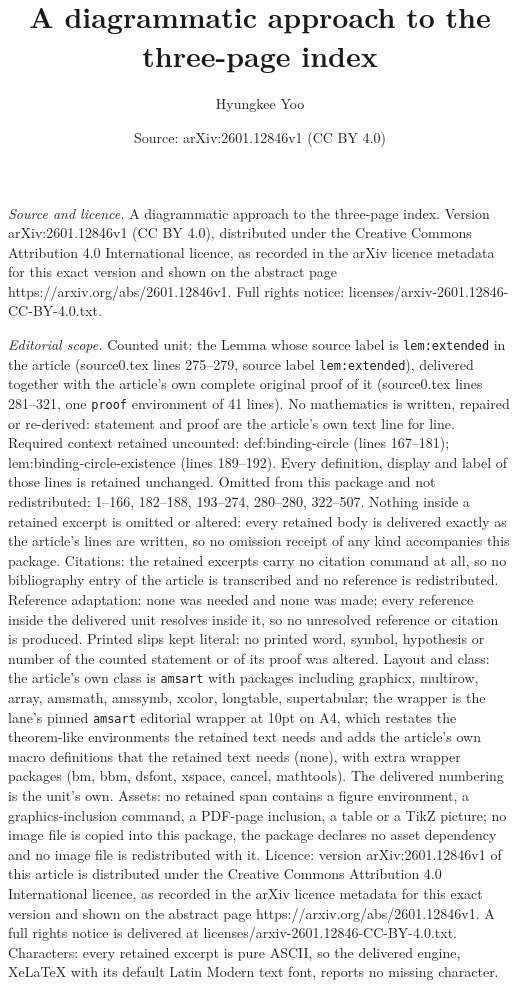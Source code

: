 \documentclass[10pt,a4paper]{amsart}
\title[A diagrammatic approach to the three-page index]{A diagrammatic approach to the three-page index}
\author{Hyungkee Yoo}
\date{Source: arXiv:2601.12846v1 (CC BY 4.0)}
\begin{document}
\maketitle

\noindent\emph{Source and licence.} A diagrammatic approach to the three-page index. Version arXiv:2601.12846v1 (CC BY 4.0), distributed under the Creative Commons Attribution 4.0 International licence, as recorded in the arXiv licence metadata for this exact version and shown on the abstract page https://arxiv.org/abs/2601.12846v1. Full rights notice: licenses/arxiv-2601.12846-CC-BY-4.0.txt.\par\smallskip

\noindent\textit{Editorial scope.} Counted unit: the Lemma whose source label is \texttt{lem:extended} in the article (source0.tex lines 275--279, source label \texttt{lem:extended}), delivered together with the article's own complete original proof of it (source0.tex lines 281--321, one \texttt{proof} environment of 41 lines). No mathematics is written, repaired or re-derived: statement and proof are the article's own text line for line. Required context retained uncounted: def:binding-circle (lines 167--181); lem:binding-circle-existence (lines 189--192). Every definition, display and label of those lines is retained unchanged. Omitted from this package and not redistributed: 1--166, 182--188, 193--274, 280--280, 322--507. Nothing inside a retained excerpt is omitted or altered: every retained body is delivered exactly as the article's lines are written, so no omission receipt of any kind accompanies this package. Citations: the retained excerpts carry no citation command at all, so no bibliography entry of the article is transcribed and no reference is redistributed. Reference adaptation: none was needed and none was made; every reference inside the delivered unit resolves inside it, so no unresolved reference or citation is produced. Printed slips kept literal: no printed word, symbol, hypothesis or number of the counted statement or of its proof was altered. Layout and class: the article's own class is \texttt{amsart} with packages including graphicx, multirow, array, amsmath, amssymb, xcolor, longtable, supertabular; the wrapper is the lane's pinned \texttt{amsart} editorial wrapper at 10pt on A4, which restates the theorem-like environments the retained text needs and adds the article's own macro definitions that the retained text needs (none), with extra wrapper packages (bm, bbm, dsfont, xspace, cancel, mathtools). The delivered numbering is the unit's own. Assets: no retained span contains a figure environment, a graphics-inclusion command, a PDF-page inclusion, a table or a TikZ picture; no image file is copied into this package, the package declares no asset dependency and no image file is redistributed with it. Licence: version arXiv:2601.12846v1 of this article is distributed under the Creative Commons Attribution 4.0 International licence, as recorded in the arXiv licence metadata for this exact version and shown on the abstract page https://arxiv.org/abs/2601.12846v1. A full rights notice is delivered at licenses/arxiv-2601.12846-CC-BY-4.0.txt. Characters: every retained excerpt is pure ASCII, so the delivered engine, XeLaTeX with its default Latin Modern text font, reports no missing character.
\end{document}
